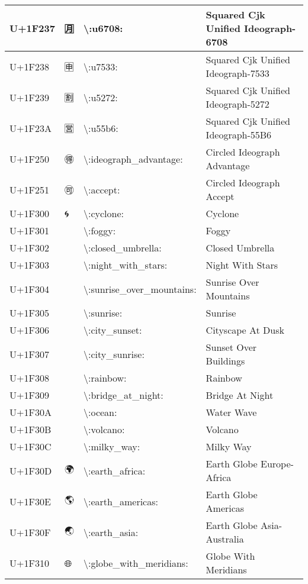 \begin{table}[h]
\begin{tabulary}{\linewidth}{|L|L|L|L|}
U+1F237 & 🈷 & {\textbackslash}:u6708: & Squared Cjk Unified Ideograph-6708 \\
\hline
U+1F238 & 🈸 & {\textbackslash}:u7533: & Squared Cjk Unified Ideograph-7533 \\
\hline
U+1F239 & 🈹 & {\textbackslash}:u5272: & Squared Cjk Unified Ideograph-5272 \\
\hline
U+1F23A & 🈺 & {\textbackslash}:u55b6: & Squared Cjk Unified Ideograph-55B6 \\
\hline
U+1F250 & 🉐 & {\textbackslash}:ideograph\_advantage: & Circled Ideograph Advantage \\
\hline
U+1F251 & 🉑 & {\textbackslash}:accept: & Circled Ideograph Accept \\
\hline
U+1F300 & 🌀 & {\textbackslash}:cyclone: & Cyclone \\
\hline
U+1F301 & 🌁 & {\textbackslash}:foggy: & Foggy \\
\hline
U+1F302 & 🌂 & {\textbackslash}:closed\_umbrella: & Closed Umbrella \\
\hline
U+1F303 & 🌃 & {\textbackslash}:night\_with\_stars: & Night With Stars \\
\hline
U+1F304 & 🌄 & {\textbackslash}:sunrise\_over\_mountains: & Sunrise Over Mountains \\
\hline
U+1F305 & 🌅 & {\textbackslash}:sunrise: & Sunrise \\
\hline
U+1F306 & 🌆 & {\textbackslash}:city\_sunset: & Cityscape At Dusk \\
\hline
U+1F307 & 🌇 & {\textbackslash}:city\_sunrise: & Sunset Over Buildings \\
\hline
U+1F308 & 🌈 & {\textbackslash}:rainbow: & Rainbow \\
\hline
U+1F309 & 🌉 & {\textbackslash}:bridge\_at\_night: & Bridge At Night \\
\hline
U+1F30A & 🌊 & {\textbackslash}:ocean: & Water Wave \\
\hline
U+1F30B & 🌋 & {\textbackslash}:volcano: & Volcano \\
\hline
U+1F30C & 🌌 & {\textbackslash}:milky\_way: & Milky Way \\
\hline
U+1F30D & 🌍 & {\textbackslash}:earth\_africa: & Earth Globe Europe-Africa \\
\hline
U+1F30E & 🌎 & {\textbackslash}:earth\_americas: & Earth Globe Americas \\
\hline
U+1F30F & 🌏 & {\textbackslash}:earth\_asia: & Earth Globe Asia-Australia \\
\hline
U+1F310 & 🌐 & {\textbackslash}:globe\_with\_meridians: & Globe With Meridians \\

\end{tabulary}
\end{table}
